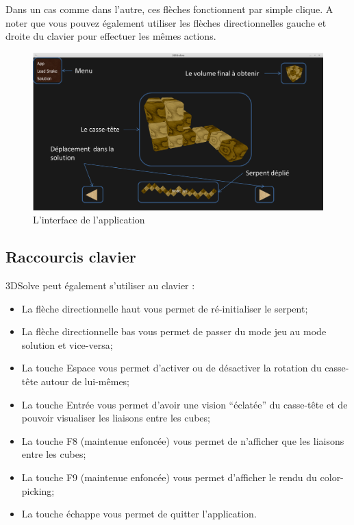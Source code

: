 \documentclass[a4paper,10pt]{article}
\begin{document}
Dans un cas comme dans l'autre, ces flèches fonctionnent par simple clique. A noter que vous pouvez également utiliser les flèches directionnelles gauche et droite du clavier pour effectuer les mêmes actions.

\begin{figure}[h]
 \centering
 \includegraphics[scale=0.4,keepaspectratio=true]{guide.png}
 \caption{L'interface de l'application}
 \label{guide}
\end{figure}

\subsection{Raccourcis clavier}
3DSolve peut également s'utiliser au clavier :
\begin{itemize}
 \item La flèche directionnelle haut vous permet de ré-initialiser le serpent;
 \item La flèche directionnelle bas vous permet de passer du mode jeu au mode solution et vice-versa;
 \item La touche Espace vous permet d'activer ou de désactiver la rotation du casse-tête autour de lui-mêmes;
 \item La touche Entrée vous permet d'avoir une vision ``éclatée'' du casse-tête et de pouvoir visualiser les liaisons entre les cubes;
 \item La touche F8 (maintenue enfoncée) vous permet de n'afficher que les liaisons entre les cubes;
 \item La touche F9 (maintenue enfoncée) vous permet d'afficher le rendu du color-picking;
 \item La touche échappe vous permet de quitter l'application.
\end{itemize}
\end{document}
